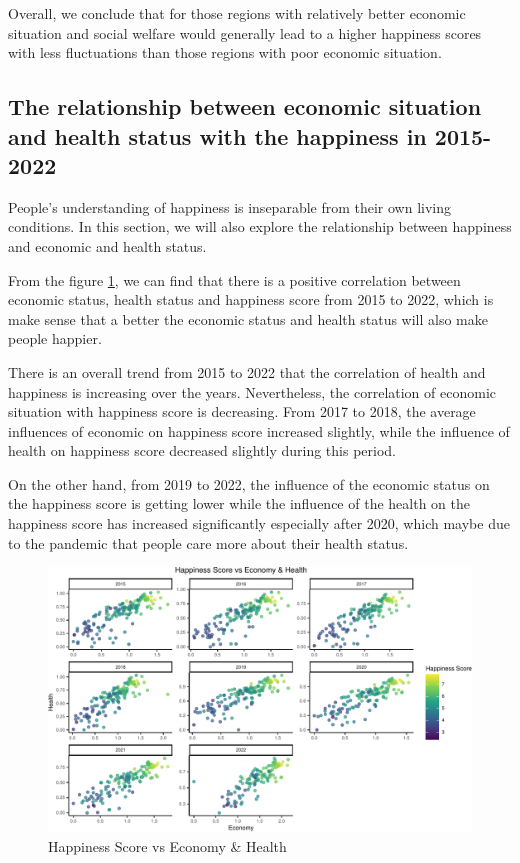 \documentclass[11pt,a4paper,]{article}
\begin{document}
Overall, we conclude that for those regions with relatively better economic situation and social welfare would generally lead to a higher happiness scores with less fluctuations than those regions with poor economic situation.

\hypertarget{the-relationship-between-economic-situation-and-health-status-with-the-happiness-in-2015-2022}{%
\subsection{The relationship between economic situation and health status with the happiness in 2015-2022}\label{the-relationship-between-economic-situation-and-health-status-with-the-happiness-in-2015-2022}}

People's understanding of happiness is inseparable from their own living conditions. In this section, we will also explore the relationship between happiness and economic and health status.

From the figure \ref{fig:VS}, we can find that there is a positive correlation between economic status, health status and happiness score from 2015 to 2022, which is make sense that a better the economic status and health status will also make people happier.

There is an overall trend from 2015 to 2022 that the correlation of health and happiness is increasing over the years. Nevertheless, the correlation of economic situation with happiness score is decreasing. From 2017 to 2018, the average influences of economic on happiness score increased slightly, while the influence of health on happiness score decreased slightly during this period.

On the other hand, from 2019 to 2022, the influence of the economic status on the happiness score is getting lower while the influence of the health on the happiness score has increased significantly especially after 2020, which maybe due to the pandemic that people care more about their health status.

\begin{figure}
\centering
\includegraphics{Assignment4_files/figure-latex/VS-1.pdf}
\caption{\label{fig:VS}Happiness Score vs Economy \& Health}
\end{figure}
\end{document}
